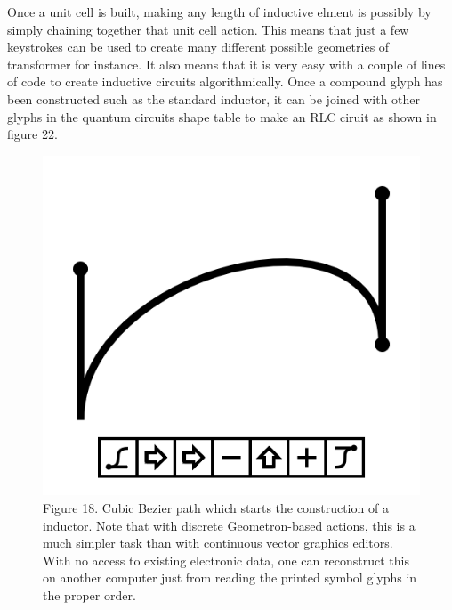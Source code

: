 \documentclass[11pt]{article}
\begin{document}
    Once a unit cell is built, making any length of inductive elment is possibly by simply chaining together that unit cell action.  This means that just a few keystrokes can be used to create many different possible geometries of transformer for instance.  It also means that it is very easy with a couple of lines of code to create inductive circuits algorithmically. Once a compound glyph has been constructed such as the standard inductor, it can be joined with other glyphs in the quantum circuits shape table to make an RLC ciruit as shown in figure 22.  


\begin{figure}

\includegraphics[width=\linewidth]{figures/figure18_coilBezier1.png}

\caption{Figure 18. Cubic Bezier path which starts the construction of a inductor.  Note that with discrete Geometron-based actions, this is a much simpler task than with continuous vector graphics editors.  With no access to existing electronic data, one can reconstruct this on another computer just from reading the printed symbol glyphs in the proper order.}
\end{figure}
\end{document}
